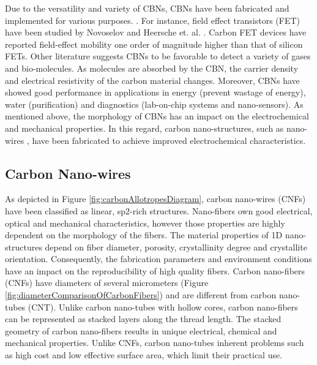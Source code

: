 Due to the versatility and variety of CBNs, CBNs have been fabricated and implemented for various purposes. \cite{Geim2011, Katsnelson2008, Li2008, Geim2007, Geim2009, Siddiqui2019}. For instance, field effect transistors (FET) have been studied by Novoselov \cite{Novoselov2004} and Heersche et. al. \cite{Heersche2007}. Carbon FET devices have reported field-effect mobility one order of magnitude higher than that of silicon FETs. Other literature suggests CBNs to be favorable to detect a variety of gases and bio-molecules. \cite{Schedin2007, Ohno2009} As molecules are absorbed by the CBN, the carrier density and electrical resistivity of the carbon material changes. Moreover, CBNs have showed good performance in applications in energy (prevent wastage of energy), water (purification) and diagnostics (lab-on-chip systems and nano-sensors). \cite{Cao2011, Khanna2016} As mentioned above, the morphology of CBNs has an impact on the electrochemical and mechanical properties. \cite{Marsh1989, Hugh1994, Guo2018} In this regard, carbon nano-structures, such as nano-wires \cite{Kundu2019, Bencheikh2019, Bencheikh2019}, have been fabricated to achieve improved electrochemical characteristics.

\subsection{Carbon Nano-wires}

As depicted in Figure \ref{fig:carbonAllotropesDiagram}, carbon nano-wires (CNFs) have been classified as linear, sp2-rich structures. \cite{Heersche2007, Heimann1997, Belenkov2003, Fedel2013, Razeghi2019, AlstrupJensen2015, Vajtai2013} Nano-fibers own good electrical, optical and mechanical characteristics, however those properties are highly dependent on the morphology of the fibers. \cite{Dresselhaus2007} The material properties of 1D nano-structures depend on fiber diameter, porosity, crystallinity degree and crystallite orientation. Consequently, the fabrication parameters and environment conditions have an impact on the reproducibility of high quality fibers. \cite{Dresselhaus2007} Carbon nano-fibers (CNFs) have diameters of several micrometers (Figure \ref{fig:diameterComparisonOfCarbonFibers}) and are different from carbon nano-tubes (CNT). \cite{Weil1992, Huang2009, chung2012carbon, Subramoney1997, Dresselhaus2000} Unlike carbon nano-tubes with hollow cores, carbon nano-fibers can be represented as stacked layers along the thread length. \cite{Dresselhaus2000, Rodriguez1993, Yoon2004} The stacked geometry of carbon nano-fibers results in unique electrical, chemical and mechanical properties. \cite{Liu2009, Endo2003, Yokozeki2009} Unlike CNFs, carbon nano-tubes inherent problems such as high cost and low effective surface area, which limit their practical use. \cite{Vajtai2013}


